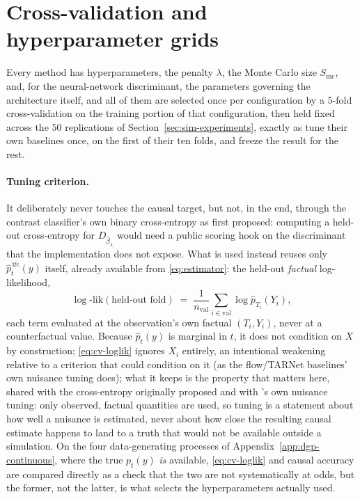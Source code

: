 \documentclass[11pt]{article}
\theoremstyle{plain}
\theoremstyle{definition}
\theoremstyle{remark}
\newcommand{\betahat}{\widehat{\beta}}
\begin{document}
\section{Cross-validation and hyperparameter grids}
\label{app:cv}

Every method has hyperparameters, the penalty $\lambda$, the Monte Carlo size $S_{\mathrm{mc}}$, and, for the
neural-network discriminant, the parameters governing the architecture
itself, and all of them are selected once per configuration by a $5$-fold
cross-validation on the training portion of that configuration, then held fixed across the $50$
replications of Section~\ref{sec:sim-experiments}, exactly as \citet{melnychuk2023flows} tune
their own baselines once, on the first of their ten folds, and freeze the result for the rest.

\paragraph{Tuning criterion.} It deliberately never touches the causal target, but not, in the
end, through the contrast classifier's own binary cross-entropy as first proposed: computing a
held-out cross-entropy for $D_{\betahat_\lambda}$ would need a public scoring hook on the
discriminant that the implementation does not expose. What is used instead
reuses only $\widehat p^{\,\mathrm{ifc}}_t(y)$ itself, already available from \eqref{eq:estimator}:
the held-out \emph{factual} log-likelihood,
\begin{equation}
\log\text{-lik}(\text{held-out fold}) \;=\; \frac{1}{n_{\mathrm{val}}}\sum_{i \in \mathrm{val}}
\log \widehat p_{T_i}(Y_i),
\label{eq:cv-loglik}
\end{equation}
each term evaluated at the observation's own factual $(T_i,Y_i)$, never at a counterfactual value.
Because $\widehat p_t(y)$ is marginal in $t$, it does not condition on $X$ by construction;
\eqref{eq:cv-loglik} ignores $X_i$ entirely, an intentional weakening relative to a
criterion that could condition on it (as the flow/TARNet baselines' own nuisance tuning does);
what it keeps is the property that matters here, shared with the cross-entropy originally
proposed and with \citet{melnychuk2023flows}'s own nuisance tuning: only observed, factual
quantities are used, so tuning is a statement about how well a nuisance is estimated, never about
how close the resulting causal estimate happens to land to a truth that would not be available
outside a simulation. On the four data-generating processes of Appendix~\ref{app:dgp-continuous},
where the true $p_t(y)$ \emph{is} available, \eqref{eq:cv-loglik} and causal accuracy are compared
directly as a check that the two are not systematically at odds, but the former, not the latter,
is what selects the hyperparameters actually used.
\end{document}

